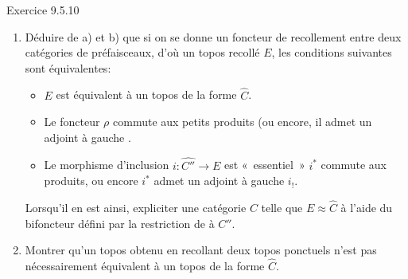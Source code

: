 \begin{enonce*}[remark]{Exercice 9.5.10}
\begin{enumerate}
\item Déduire de a) et b) que si on se donne un foncteur de
recollement  entre deux catégories de
préfaisceaux,
d'où un topos recollé $E$, les conditions suivantes sont
équivalentes:
\begin{itemize}
\item[(i)] $E$ est équivalent à un topos de la forme $\widehat{C}$.

\item[(ii)] Le foncteur $\rho$ commute aux petits produits (ou encore, il
admet un adjoint à gauche .

\item[(iii)] Le morphisme d'inclusion $i:\widehat{C''}\rightarrow E$ est « essentiel »  \ie $i^{\ast}$ commute aux produits, ou encore
$i^{\ast}$ admet un adjoint à gauche $i_{!}$.
\end{itemize}
Lorsqu'il en est ainsi, expliciter une catégorie $C$ telle que
$E\approx \widehat{C}$ à l'aide du bifoncteur 
défini par la restriction de  à $C''$.

\item Montrer qu'un topos obtenu en recollant deux topos ponctuels
n'est pas nécessairement équivalent à un topos de la forme
$\widehat{C}$.
\end{enumerate}
\end{enonce*}


